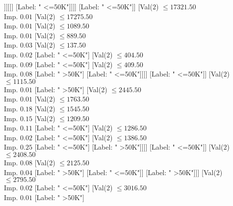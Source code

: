 \documentclass[margin=10pt]{standalone}
\begin{document}
\begin{forest}
															[Label: " <=50K"]
															[Val($2$) $ \leq 17910.50$ \\ Imp. $0.42$
																[Label: " >50K"]
																[Val($2$) $ \leq 18160.50$ \\ Imp. $0.92$
																	[Label: " <=50K"]
																	[Label: " >50K"]]]]]]
												[Label: " <=50K"]]]]
									[Label: " <=50K"]]
								[Val($2$) $ \leq 17321.50$ \\ Imp. $0.01$
									[Val($2$) $ \leq 17275.50$ \\ Imp. $0.01$
										[Val($2$) $ \leq 1089.50$ \\ Imp. $0.01$
											[Val($2$) $ \leq 889.50$ \\ Imp. $0.03$
												[Val($2$) $ \leq 137.50$ \\ Imp. $0.02$
													[Label: " <=50K"]
													[Val($2$) $ \leq 404.50$ \\ Imp. $0.09$
														[Label: " <=50K"]
														[Val($2$) $ \leq 409.50$ \\ Imp. $0.08$
															[Label: " >50K"]
															[Label: " <=50K"]]]]
												[Label: " <=50K"]]
											[Val($2$) $ \leq 1115.50$ \\ Imp. $0.01$
												[Label: " >50K"]
												[Val($2$) $ \leq 2445.50$ \\ Imp. $0.01$
													[Val($2$) $ \leq 1763.50$ \\ Imp. $0.18$
														[Val($2$) $ \leq 1545.50$ \\ Imp. $0.15$
															[Val($2$) $ \leq 1209.50$ \\ Imp. $0.11$
																[Label: " <=50K"]
																[Val($2$) $ \leq 1286.50$ \\ Imp. $0.02$
																	[Label: " <=50K"]
																	[Val($2$) $ \leq 1386.50$ \\ Imp. $0.25$
																		[Label: " <=50K"]
																		[Label: " >50K"]]]]
															[Label: " <=50K"]]
														[Val($2$) $ \leq 2408.50$ \\ Imp. $0.08$
															[Val($2$) $ \leq 2125.50$ \\ Imp. $0.04$
																[Label: " >50K"]
																[Label: " <=50K"]]
															[Label: " >50K"]]]
													[Val($2$) $ \leq 2795.50$ \\ Imp. $0.02$
														[Label: " <=50K"]
														[Val($2$) $ \leq 3016.50$ \\ Imp. $0.01$
															[Label: " >50K"]

\end{forest}
\end{document}
